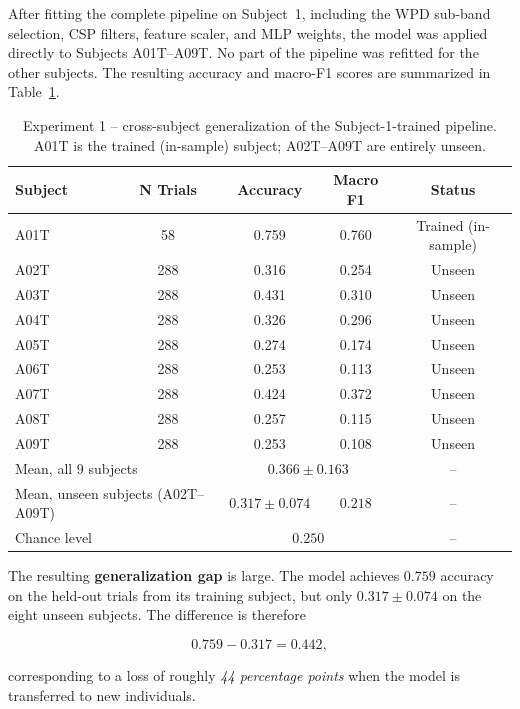 \documentclass[11pt,a4paper]{article}
\begin{document}
After fitting the complete pipeline on Subject~1, including the WPD sub-band selection, CSP
filters, feature scaler, and MLP weights, the model was applied directly to Subjects A01T--A09T.
No part of the pipeline was refitted for the other subjects. The resulting accuracy and macro-F1
scores are summarized in Table~\ref{tab:exp1-crosssubject}.

\begin{table}[H]
	\centering
	\caption{Experiment 1 -- cross-subject generalization of the Subject-1-trained pipeline. A01T is the
		trained (in-sample) subject; A02T--A09T are entirely unseen.}
	\label{tab:exp1-crosssubject}
	\begin{tabular}{lcccc}
		\toprule
		\textbf{Subject} & \textbf{N Trials} & \textbf{Accuracy} & \textbf{Macro F1} & \textbf{Status} \\
		\midrule
		A01T & 58  & 0.759 & 0.760 & Trained (in-sample) \\
		A02T & 288 & 0.316 & 0.254 & Unseen \\
		A03T & 288 & 0.431 & 0.310 & Unseen \\
		A04T & 288 & 0.326 & 0.296 & Unseen \\
		A05T & 288 & 0.274 & 0.174 & Unseen \\
		A06T & 288 & 0.253 & 0.113 & Unseen \\
		A07T & 288 & 0.424 & 0.372 & Unseen \\
		A08T & 288 & 0.257 & 0.115 & Unseen \\
		A09T & 288 & 0.253 & 0.108 & Unseen \\
		\midrule
		\multicolumn{2}{l}{Mean, all 9 subjects} & \multicolumn{2}{c}{$0.366 \pm 0.163$} & -- \\
		\multicolumn{2}{l}{Mean, unseen subjects (A02T--A09T)} & $0.317 \pm 0.074$ & $0.218$ & -- \\
		\multicolumn{2}{l}{Chance level} & \multicolumn{2}{c}{$0.250$} & -- \\
		\bottomrule
	\end{tabular}
\end{table}

\noindent
The resulting \textbf{generalization gap} is large. The model achieves $0.759$ accuracy on
the held-out trials from its training subject, but only $0.317 \pm 0.074$ on the eight unseen
subjects. The difference is therefore

\[
0.759 - 0.317 = 0.442,
\]

corresponding to a loss of roughly \emph{44 percentage points} when the model is transferred
to new individuals.
\end{document}
